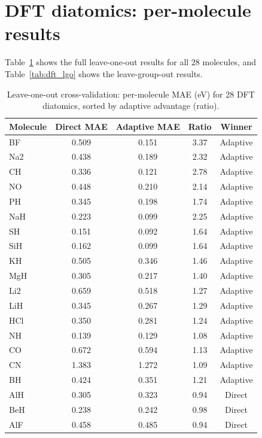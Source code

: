 \documentclass[aps,prb,twocolumn,superscriptaddress,longbibliography,floatfix]{revtex4-2}
\begin{document}
\section{DFT diatomics: per-molecule results}
\label{app:dft_details}

Table~\ref{tab:dft_loo} shows the full leave-one-out results for all 28 molecules, and Table~\ref{tab:dft_lgo} shows the leave-group-out results.

\begin{table}[h]
  \caption{Leave-one-out cross-validation: per-molecule MAE (eV) for 28 DFT diatomics, sorted by adaptive advantage (ratio).}
  \label{tab:dft_loo}
  \begin{ruledtabular}
  \begin{tabular}{lcccc}
    Molecule & Direct MAE & Adaptive MAE & Ratio & Winner \\
    \hline
    BF   & 0.509 & 0.151 & 3.37 & Adaptive \\
    Na2  & 0.438 & 0.189 & 2.32 & Adaptive \\
    CH   & 0.336 & 0.121 & 2.78 & Adaptive \\
    NO   & 0.448 & 0.210 & 2.14 & Adaptive \\
    PH   & 0.345 & 0.198 & 1.74 & Adaptive \\
    NaH  & 0.223 & 0.099 & 2.25 & Adaptive \\
    SH   & 0.151 & 0.092 & 1.64 & Adaptive \\
    SiH  & 0.162 & 0.099 & 1.64 & Adaptive \\
    KH   & 0.505 & 0.346 & 1.46 & Adaptive \\
    MgH  & 0.305 & 0.217 & 1.40 & Adaptive \\
    Li2  & 0.659 & 0.518 & 1.27 & Adaptive \\
    LiH  & 0.345 & 0.267 & 1.29 & Adaptive \\
    HCl  & 0.350 & 0.281 & 1.24 & Adaptive \\
    NH   & 0.139 & 0.129 & 1.08 & Adaptive \\
    CO   & 0.672 & 0.594 & 1.13 & Adaptive \\
    CN   & 1.383 & 1.272 & 1.09 & Adaptive \\
    BH   & 0.424 & 0.351 & 1.21 & Adaptive \\
    AlH  & 0.305 & 0.323 & 0.94 & Direct \\
    BeH  & 0.238 & 0.242 & 0.98 & Direct \\
    AlF  & 0.458 & 0.485 & 0.94 & Direct \\

\end{tabular}
\end{ruledtabular}
\end{table}
\end{document}
